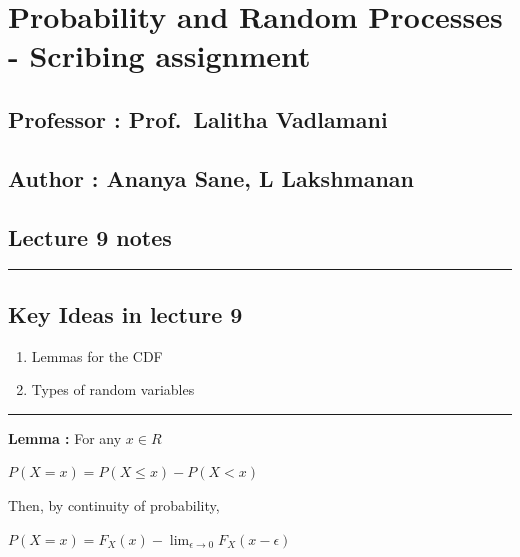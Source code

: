 \hypertarget{probability-and-random-processes---scribing-assignment}{%
\section{Probability and Random Processes - Scribing
assignment}\label{probability-and-random-processes---scribing-assignment}}

\hypertarget{professor-prof.-lalitha-vadlamani}{%
\subsection{Professor : Prof.~Lalitha
Vadlamani}\label{professor-prof.-lalitha-vadlamani}}

\hypertarget{author-ananya-sane-l-lakshmanan}{%
\subsection{Author : Ananya Sane, L
Lakshmanan}\label{author-ananya-sane-l-lakshmanan}}

\hypertarget{lecture-9-notes}{%
\subsection{Lecture 9 notes}\label{lecture-9-notes}}

\begin{center}\rule{0.5\linewidth}{0.5pt}\end{center}

\hypertarget{key-ideas-in-lecture-9}{%
\subsection{Key Ideas in lecture 9}\label{key-ideas-in-lecture-9}}

\begin{enumerate}
\def\labelenumi{\arabic{enumi}.}
\item
  Lemmas for the CDF
\item
  Types of random variables
\end{enumerate}

\begin{center}\rule{0.5\linewidth}{0.5pt}\end{center}

\textbf{Lemma :} For any \(x \in R\)

\(P(X = x) = P(X \leq x) - P(X < x)\)

Then, by continuity of probability,

\(P(X = x) = F_X(x) - \displaystyle\lim_{\epsilon \to 0} F_X(x -\epsilon)\)

